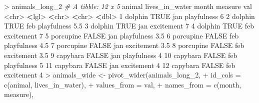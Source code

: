 \documentclass[
]{book}
\newenvironment{Shaded}{\begin{snugshade}}{\end{snugshade}}
\newcommand{\AttributeTok}[1]{\textcolor[rgb]{0.77,0.63,0.00}{#1}}
\newcommand{\CommentTok}[1]{\textcolor[rgb]{0.56,0.35,0.01}{\textit{#1}}}
\newcommand{\ConstantTok}[1]{\textcolor[rgb]{0.00,0.00,0.00}{#1}}
\newcommand{\DecValTok}[1]{\textcolor[rgb]{0.00,0.00,0.81}{#1}}
\newcommand{\ErrorTok}[1]{\textcolor[rgb]{0.64,0.00,0.00}{\textbf{#1}}}
\newcommand{\FloatTok}[1]{\textcolor[rgb]{0.00,0.00,0.81}{#1}}
\newcommand{\FunctionTok}[1]{\textcolor[rgb]{0.00,0.00,0.00}{#1}}
\newcommand{\NormalTok}[1]{#1}
\newcommand{\OtherTok}[1]{\textcolor[rgb]{0.56,0.35,0.01}{#1}}
\newcommand{\SpecialCharTok}[1]{\textcolor[rgb]{0.00,0.00,0.00}{#1}}
\newcommand{\StringTok}[1]{\textcolor[rgb]{0.31,0.60,0.02}{#1}}
\begin{document}
\begin{Shaded}
\begin{Highlighting}[]
\SpecialCharTok{\textgreater{}}\NormalTok{ animals\_long\_2}
\CommentTok{\# A tibble: 12 x 5}
\NormalTok{   animal    lives\_in\_water month measure       val}
   \SpecialCharTok{\textless{}}\NormalTok{chr}\SpecialCharTok{\textgreater{}}     \ErrorTok{\textless{}}\NormalTok{lgl}\SpecialCharTok{\textgreater{}}          \ErrorTok{\textless{}}\NormalTok{chr}\SpecialCharTok{\textgreater{}} \ErrorTok{\textless{}}\NormalTok{chr}\SpecialCharTok{\textgreater{}}       \ErrorTok{\textless{}}\NormalTok{dbl}\SpecialCharTok{\textgreater{}}
 \DecValTok{1}\NormalTok{ dolphin   }\ConstantTok{TRUE}\NormalTok{           jan   playfulness   }\DecValTok{6}  
 \DecValTok{2}\NormalTok{ dolphin   }\ConstantTok{TRUE}\NormalTok{           feb   playfulness   }\FloatTok{5.5}
 \DecValTok{3}\NormalTok{ dolphin   }\ConstantTok{TRUE}\NormalTok{           jan   excitement    }\DecValTok{7}  
 \DecValTok{4}\NormalTok{ dolphin   }\ConstantTok{TRUE}\NormalTok{           feb   excitement    }\DecValTok{7}  
 \DecValTok{5}\NormalTok{ porcupine }\ConstantTok{FALSE}\NormalTok{          jan   playfulness   }\FloatTok{3.5}
 \DecValTok{6}\NormalTok{ porcupine }\ConstantTok{FALSE}\NormalTok{          feb   playfulness   }\FloatTok{4.5}
 \DecValTok{7}\NormalTok{ porcupine }\ConstantTok{FALSE}\NormalTok{          jan   excitement    }\FloatTok{3.5}
 \DecValTok{8}\NormalTok{ porcupine }\ConstantTok{FALSE}\NormalTok{          feb   excitement    }\FloatTok{3.5}
 \DecValTok{9}\NormalTok{ capybara  }\ConstantTok{FALSE}\NormalTok{          jan   playfulness   }\DecValTok{4}  
\DecValTok{10}\NormalTok{ capybara  }\ConstantTok{FALSE}\NormalTok{          feb   playfulness   }\DecValTok{5}  
\DecValTok{11}\NormalTok{ capybara  }\ConstantTok{FALSE}\NormalTok{          jan   excitement    }\DecValTok{4}  
\DecValTok{12}\NormalTok{ capybara  }\ConstantTok{FALSE}\NormalTok{          feb   excitement    }\DecValTok{4}  
\SpecialCharTok{\textgreater{}}\NormalTok{ animals\_wide }\OtherTok{\textless{}{-}} \FunctionTok{pivot\_wider}\NormalTok{(animals\_long\_2,}
\SpecialCharTok{+}                             \AttributeTok{id\_cols =} \FunctionTok{c}\NormalTok{(}\StringTok{\textquotesingle{}animal\textquotesingle{}}\NormalTok{, }\StringTok{\textquotesingle{}lives\_in\_water\textquotesingle{}}\NormalTok{),}
\SpecialCharTok{+}                             \AttributeTok{values\_from =} \StringTok{\textquotesingle{}val\textquotesingle{}}\NormalTok{,}
\SpecialCharTok{+}                             \AttributeTok{names\_from =} \FunctionTok{c}\NormalTok{(}\StringTok{\textquotesingle{}month\textquotesingle{}}\NormalTok{, }\StringTok{\textquotesingle{}measure\textquotesingle{}}\NormalTok{),}

\end{Highlighting}
\end{Shaded}
\end{document}
